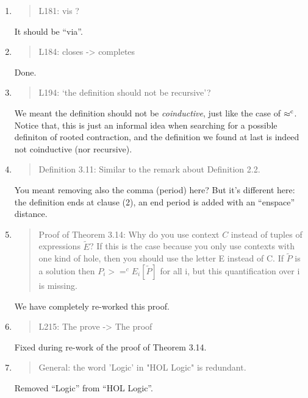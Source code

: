 \begin{enumerate}
\item \begin{quote}
    L181: vis ?
  \end{quote}

  It should be ``via''.
  
\item \begin{quote}
    L184: closes -> completes
  \end{quote}
  Done.
  
\item \begin{quote}
    L194: ‘the definition should not be recursive’?
  \end{quote}

  We meant the definition should not be \emph{coinductive}, just like the
  case of $\mathrel{\approx^{\rm{c}}}$. Notice that, this is just an informal idea when searching for
  a possible definiton of rooted contraction, and the definition we
  found at last is indeed not coinductive (nor recursive).
  
\item \begin{quote}
    Definition 3.11: Similar to the remark about Definition 2.2.
  \end{quote}
  You meant removing also the comma (period) here? But it's different
  here: the definition ends at clause (2), an end period is added with
  an ``enspace'' distance.
  
\item \begin{quote}
    Proof of Theorem 3.14: Why do you use context $C$ instead of tuples of expressions $\tilde{E}$?
    If this is the case because you only use contexts with one kind of hole, then you should use the letter
    E instead of C.
    If $\tilde{P}$ is a solution then $P_i >=^c E_i[\tilde{P}]$ for all i, but this quantification over i is missing.
  \end{quote}
  We have completely re-worked this proof.

\item \begin{quote}
    L215: The prove -> The proof
  \end{quote}
  Fixed during re-work of the proof of Theorem 3.14.
  
\item \begin{quote}
    General: the word 'Logic' in "HOL Logic" is redundant.
  \end{quote}
  Removed ``Logic'' from ``HOL Logic''.
  

\end{enumerate}
